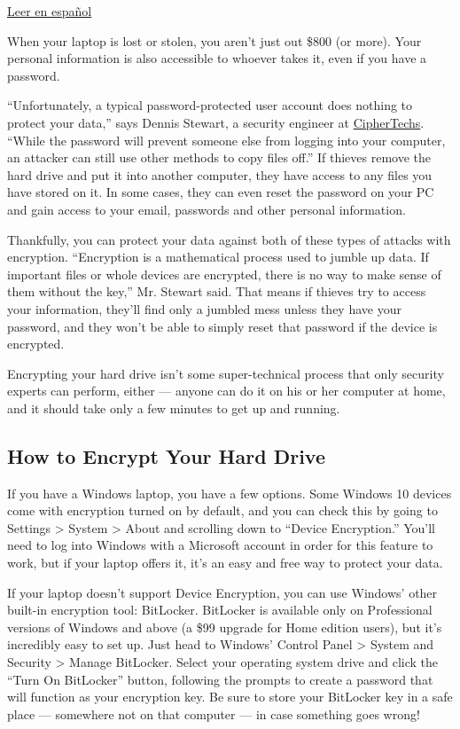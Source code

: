 \href{https://www.nytimes.com/es/2018/03/19/computadora-encriptacion-robo/}{Leer
en español}

When your laptop is lost or stolen, you aren't just out \$800 (or more).
Your personal information is also accessible to whoever takes it, even
if you have a password.

``Unfortunately, a typical password-protected user account does nothing
to protect your data,'' says Dennis Stewart, a security engineer at
\href{https://www.ciphertechs.com/}{CipherTechs}. ``While the password
will prevent someone else from logging into your computer, an attacker
can still use other methods to copy files off.'' If thieves remove the
hard drive and put it into another computer, they have access to any
files you have stored on it. In some cases, they can even reset the
password on your PC and gain access to your email, passwords and other
personal information.

Thankfully, you can protect your data against both of these types of
attacks with encryption. ``Encryption is a mathematical process used to
jumble up data. If important files or whole devices are encrypted, there
is no way to make sense of them without the key,'' Mr. Stewart said.
That means if thieves try to access your information, they'll find only
a jumbled mess unless they have your password, and they won't be able to
simply reset that password if the device is encrypted.

Encrypting your hard drive isn't some super-technical process that only
security experts can perform, either --- anyone can do it on his or her
computer at home, and it should take only a few minutes to get up and
running.

\hypertarget{how-to-encrypt-your-hard-drive}{%
\subsection{How to Encrypt Your Hard
Drive}\label{how-to-encrypt-your-hard-drive}}

If you have a Windows laptop, you have a few options. Some Windows 10
devices come with encryption turned on by default, and you can check
this by going to Settings \textgreater{} System \textgreater{} About and
scrolling down to ``Device Encryption.'' You'll need to log into Windows
with a Microsoft account in order for this feature to work, but if your
laptop offers it, it's an easy and free way to protect your data.

If your laptop doesn't support Device Encryption, you can use Windows'
other built-in encryption tool: BitLocker. BitLocker is available only
on Professional versions of Windows and above (a \$99 upgrade for Home
edition users), but it's incredibly easy to set up. Just head to
Windows' Control Panel \textgreater{} System and Security \textgreater{}
Manage BitLocker. Select your operating system drive and click the
``Turn On BitLocker'' button, following the prompts to create a password
that will function as your encryption key. Be sure to store your
BitLocker key in a safe place --- somewhere not on that computer --- in
case something goes wrong!

